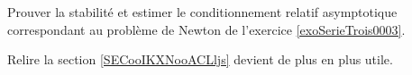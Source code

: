 
\begin{exercice}\label{exoSerieTrois0003}

	Prouver la stabilité et estimer le conditionnement relatif asymptotique correspondant au problème de Newton de l'exercice \ref{exoSerieTrois0003}.

	Relire la section \ref{SECooIKXNooACLljs} devient de plus en plus utile.

\end{exercice}
